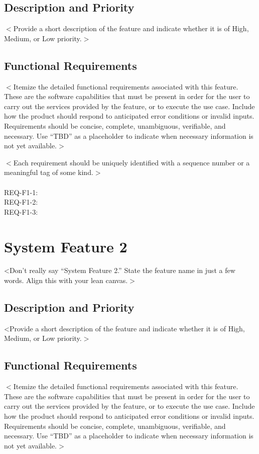 \documentclass{scrreprt}
\begin{document}
\subsection{Description and Priority}
$<$Provide a short description of the feature and indicate whether it is of High, Medium, or Low priority.$>$

\subsection{Functional Requirements}
$<$Itemize the detailed functional requirements associated with this feature.  
These are the software capabilities that must be present in order for the user 
to carry out the services provided by the feature, or to execute the use case.  
Include how the product should respond to anticipated error conditions or 
invalid inputs. Requirements should be concise, complete, unambiguous, 
verifiable, and necessary. Use ``TBD'' as a placeholder to indicate when necessary 
information is not yet available.$>$

$<$Each requirement should be uniquely identified with a sequence number or a 
meaningful tag of some kind.$>$\\\\
REQ-F1-1:\\
REQ-F1-2:\\
REQ-F1-3:

\section{System Feature 2}
<Don't really say ``System Feature 2.'' State the feature name in just a few words. Align this with your lean canvas.$>$

\subsection{Description and Priority}
<Provide a short description of the feature and indicate whether it is of High, Medium, or Low priority.$>$

\subsection{Functional Requirements}
$<$Itemize the detailed functional requirements associated with this feature.  
These are the software capabilities that must be present in order for the user 
to carry out the services provided by the feature, or to execute the use case.  
Include how the product should respond to anticipated error conditions or 
invalid inputs. Requirements should be concise, complete, unambiguous, 
verifiable, and necessary. Use ``TBD'' as a placeholder to indicate when necessary 
information is not yet available.$>$
\end{document}
